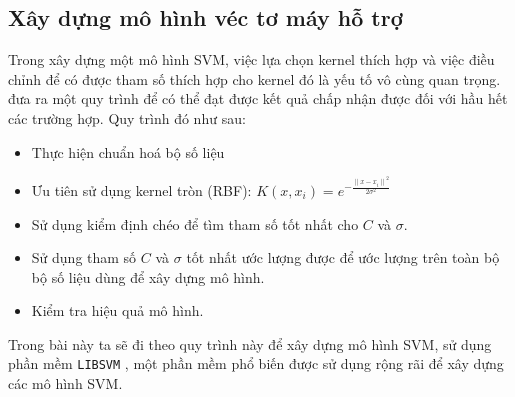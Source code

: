 \subsection{Xây dựng mô hình véc tơ máy hỗ trợ}

Trong xây dựng một mô hình SVM, việc lựa chọn kernel thích hợp và việc điều chỉnh để có được tham số thích hợp cho kernel đó là yếu tố vô cùng quan trọng. 
\textcite{hsu2003practical} đưa ra một quy trình để có thể đạt được kết quả chấp nhận được đối với hầu hết các trường hợp. Quy trình đó như sau:

\begin{itemize}
  \item Thực hiện chuẩn hoá bộ số liệu
  \item Ưu tiên sử dụng kernel tròn (RBF): $K(x, x_i) = e^{-\frac{{\|x - x_i\|}^2}{2 \sigma^2}}$
  \item Sử dụng kiểm định chéo để tìm tham số tốt nhất cho $C$ và $\sigma$.
  \item Sử dụng tham số $C$ và $\sigma$ tốt nhất ước lượng được để ước lượng trên toàn bộ bộ số liệu dùng để xây dựng mô hình.
  \item Kiểm tra hiệu quả mô hình.
\end{itemize}

Trong bài này ta sẽ đi theo quy trình này để xây dựng mô hình SVM, sử dụng phần mềm \texttt{LIBSVM} \textcite{CC01a}, một phần mềm phổ biến được sử dụng rộng rãi để xây dựng các mô hình SVM.
